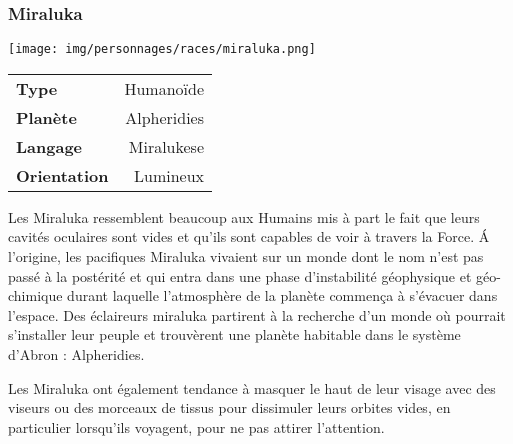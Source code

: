 \subsubsection{Miraluka}
\begin{samepage}
	\vspace{-2\baselineskip}
	\texttt{[image: img/personnages/races/miraluka.png]}

	\vspace{-5\baselineskip}

	\begin{flushright}
		\begin{tabular}{|l|r|}
			\textbf{Type} 			& Humanoïde \\
		   	\textbf{Planète} 		& Alpheridies \\
		   	\textbf{Langage} 		& Miralukese \\
		   	\textbf{Orientation} 	& Lumineux \\
		\end{tabular}
	\end{flushright}
\end{samepage}

Les Miraluka ressemblent beaucoup aux Humains mis à part le fait que leurs cavités oculaires sont vides et qu’ils sont capables de voir à travers la Force. \'A l’origine, les pacifiques Miraluka vivaient sur un monde dont le nom n’est pas passé à la postérité et qui entra dans une phase d’instabilité géophysique et géo-chimique durant laquelle l’atmosphère de la planète commença à s’évacuer dans l’espace. Des éclaireurs miraluka partirent à la recherche d’un monde où pourrait s’installer leur peuple et trouvèrent une planète habitable dans le système d’Abron : Alpheridies. 

Les Miraluka ont également tendance à masquer le haut de leur visage avec des viseurs ou des morceaux de tissus pour dissimuler leurs orbites vides, en particulier lorsqu’ils voyagent, pour ne pas attirer l’attention.


